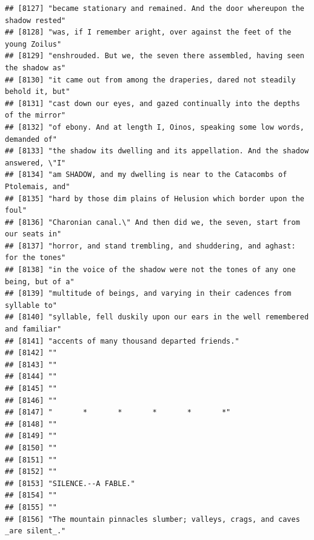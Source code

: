 \documentclass{article}\usepackage[]{graphicx}\usepackage[]{color}
\makeatletter
\newenvironment{kframe}{%
 \def\at@end@of@kframe{}%
 \ifinner\ifhmode%
  \def\at@end@of@kframe{\end{minipage}}%
  \begin{minipage}{\columnwidth}%
 \fi\fi%
 \def\FrameCommand##1{\hskip\@totalleftmargin \hskip-\fboxsep
 \colorbox{shadecolor}{##1}\hskip-\fboxsep
     \hskip-\linewidth \hskip-\@totalleftmargin \hskip\columnwidth}%
 \MakeFramed {\advance\hsize-\width
   \@totalleftmargin\z@ \linewidth\hsize
   \@setminipage}}%
 {\par\unskip\endMakeFramed%
 \at@end@of@kframe}
\newenvironment{knitrout}{}{} %
\makeatother
\begin{document}
\begin{knitrout}
\begin{kframe}
\begin{verbatim}
## [8127] "became stationary and remained. And the door whereupon the shadow rested"    
## [8128] "was, if I remember aright, over against the feet of the young Zoilus"        
## [8129] "enshrouded. But we, the seven there assembled, having seen the shadow as"    
## [8130] "it came out from among the draperies, dared not steadily behold it, but"     
## [8131] "cast down our eyes, and gazed continually into the depths of the mirror"     
## [8132] "of ebony. And at length I, Oinos, speaking some low words, demanded of"      
## [8133] "the shadow its dwelling and its appellation. And the shadow answered, \"I"   
## [8134] "am SHADOW, and my dwelling is near to the Catacombs of Ptolemais, and"       
## [8135] "hard by those dim plains of Helusion which border upon the foul"             
## [8136] "Charonian canal.\" And then did we, the seven, start from our seats in"      
## [8137] "horror, and stand trembling, and shuddering, and aghast: for the tones"      
## [8138] "in the voice of the shadow were not the tones of any one being, but of a"    
## [8139] "multitude of beings, and varying in their cadences from syllable to"         
## [8140] "syllable, fell duskily upon our ears in the well remembered and familiar"    
## [8141] "accents of many thousand departed friends."                                  
## [8142] ""                                                                            
## [8143] ""                                                                            
## [8144] ""                                                                            
## [8145] ""                                                                            
## [8146] ""                                                                            
## [8147] "       *       *       *       *       *"                                    
## [8148] ""                                                                            
## [8149] ""                                                                            
## [8150] ""                                                                            
## [8151] ""                                                                            
## [8152] ""                                                                            
## [8153] "SILENCE.--A FABLE."                                                          
## [8154] ""                                                                            
## [8155] ""                                                                            
## [8156] "The mountain pinnacles slumber; valleys, crags, and caves _are silent_."     

\end{verbatim}
\end{kframe}
\end{knitrout}
\end{document}
